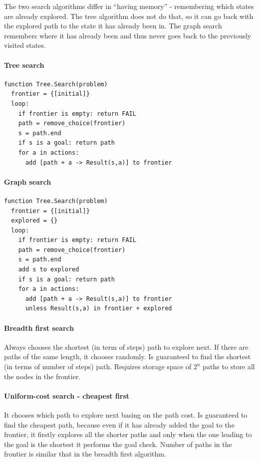 \documentclass[a4paper,10pt]{article}
\begin{document}
The two search algorithms differ in ``having memory'' - remembering which states are already explored. The tree algorithm does not do that, so it can go back with the explored path to the state it has already been in. The graph search remembers where it has already been and thus never goes back to the previously visited states.
\paragraph{Tree search}
\begin{verbatim}
function Tree.Search(problem)
  frontier = {[initial]}
  loop:
    if frontier is empty: return FAIL
    path = remove_choice(frontier)
    s = path.end
    if s is a goal: return path
    for a in actions:
      add [path + a -> Result(s,a)] to frontier
\end{verbatim}

\paragraph{Graph search}
\begin{verbatim}
function Tree.Search(problem)
  frontier = {[initial]}
  explored = {}
  loop:
    if frontier is empty: return FAIL
    path = remove_choice(frontier)
    s = path.end
    add s to explored
    if s is a goal: return path
    for a in actions:
      add [path + a -> Result(s,a)] to frontier 
      unless Result(s,a) in frontier + explored
\end{verbatim}

\paragraph{Breadth first search}
Always chooses the shortest (in term of steps) path to explore next. If there are paths of the same length, it chooses randomly. Is guaranteed to find the shortest (in terms of number of steps) path. Requires storage space of $2^n$ paths to store all the nodes in the frontier.

\paragraph{Uniform-cost search - cheapest first}
It chooses which path to explore next basing on the path cost. Is guaranteed to find the cheapest path, because even if it has already added the goal to the frontier, it firstly explores all the shorter paths and only when the one leading to the goal is the shortest it performs the goal check. Number of paths in the frontier is similar that in the breadth first algorithm.
\end{document}
